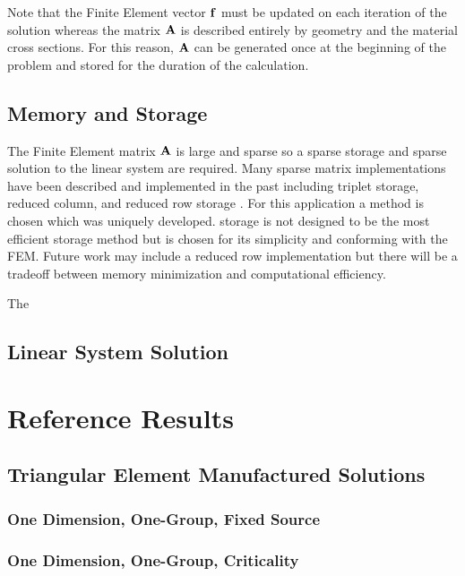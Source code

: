     Note that the Finite Element vector $\mathbf{f}$ must be updated on each iteration
    of the solution whereas the matrix $\mathbf{A}$ is described entirely by geometry 
    and the material cross sections. For this reason, $\mathbf{A}$ can be generated 
    once at the beginning of the problem and stored for the duration of the 
    calculation.
    \FloatBarrier %
  \subsection{Memory and Storage}
    The Finite Element matrix $\mathbf{A}$ is large and sparse so a sparse storage and
    sparse solution to the linear system are required. Many sparse matrix 
    implementations have been described and implemented in the past including
    triplet storage, reduced column, and reduced row storage \cite{sparseBLAS}.
    For this application a \twotable method is chosen which was uniquely 
    developed. \twotable storage is not designed to be the most efficient 
    storage method but is chosen for its simplicity and conforming with the 
    FEM. Future work may include a reduced row implementation but there will be
    a tradeoff between memory minimization and computational efficiency.
    
    The     
  \subsection{Linear System Solution}

\section{Reference Results}
  \subsection{Triangular Element Manufactured Solutions}
    \subsubsection{One Dimension, One-Group, Fixed Source}
    \subsubsection{One Dimension, One-Group, Criticality}
